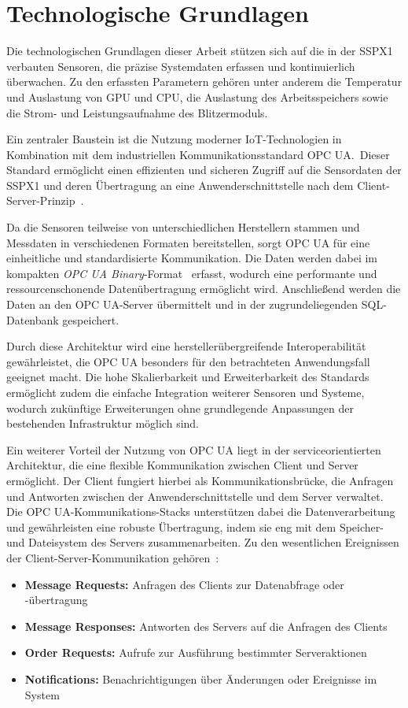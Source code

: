 \section{Technologische Grundlagen}
Die technologischen Grundlagen dieser Arbeit stützen sich auf die in der SSPX1 verbauten Sensoren, die präzise Systemdaten erfassen
und kontinuierlich überwachen. Zu den erfassten Parametern gehören unter anderem die Temperatur und Auslastung von GPU und CPU,
die Auslastung des Arbeitsspeichers sowie die Strom- und Leistungsaufnahme des Blitzermoduls.

Ein zentraler Baustein ist die Nutzung moderner IoT-Technologien in Kombination mit dem industriellen Kommunikationsstandard OPC UA.\
Dieser Standard ermöglicht einen effizienten und sicheren Zugriff auf die Sensordaten der SSPX1 und deren Übertragung an eine
Anwenderschnittstelle nach dem Client-Server-Prinzip~\cite{Babel2024}.

Da die Sensoren teilweise von unterschiedlichen Herstellern stammen und Messdaten in verschiedenen Formaten bereitstellen, sorgt OPC
UA für eine einheitliche und standardisierte Kommunikation. Die Daten werden dabei im kompakten \textit{OPC UA Binary}-Format~\cite{iec62541}
erfasst, wodurch eine performante und ressourcenschonende Datenübertragung ermöglicht wird. Anschließend werden die Daten an den OPC
UA-Server übermittelt und in der zugrundeliegenden SQL-Datenbank gespeichert. 

Durch diese Architektur wird eine herstellerübergreifende Interoperabilität gewährleistet, die OPC UA besonders für den betrachteten
Anwendungsfall geeignet macht. Die hohe Skalierbarkeit und Erweiterbarkeit des Standards ermöglicht zudem die einfache Integration
weiterer Sensoren und Systeme, wodurch zukünftige Erweiterungen ohne grundlegende Anpassungen der bestehenden Infrastruktur möglich
sind.

Ein weiterer Vorteil der Nutzung von OPC UA liegt in der serviceorientierten Architektur, die eine flexible Kommunikation
zwischen Client und Server ermöglicht. Der Client fungiert hierbei als Kommunikationsbrücke, die Anfragen und Antworten zwischen
der Anwenderschnittstelle und dem Server verwaltet. Die OPC UA-Kommunikations-Stacks unterstützen dabei die Datenverarbeitung und
gewährleisten eine robuste Übertragung, indem sie eng mit dem Speicher- und Dateisystem des Servers zusammenarbeiten. Zu den
wesentlichen Ereignissen der Client-Server-Kommunikation gehören~\cite{Babel2024,iec62541,Mao2024}:
\begin{itemize}
    \item \textbf{Message Requests:} Anfragen des Clients zur Datenabfrage oder -übertragung
    \item \textbf{Message Responses:} Antworten des Servers auf die Anfragen des Clients
    \item \textbf{Order Requests:} Aufrufe zur Ausführung bestimmter Serveraktionen
    \item \textbf{Notifications:} Benachrichtigungen über Änderungen oder Ereignisse im System
\end{itemize}

